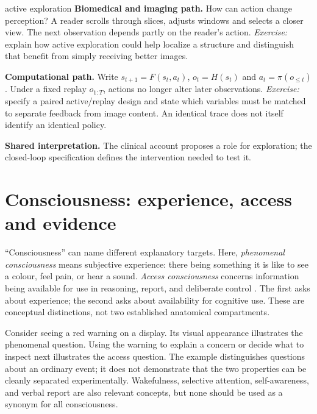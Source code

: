 \documentclass[11pt,a4paper]{article}
\begin{document}
\begin{perspectives}{active exploration}
\textbf{Biomedical and imaging path.} How can action change perception? A reader scrolls through slices, adjusts windows and selects a closer view. The next observation depends partly on the reader's action. \emph{Exercise:} explain how active exploration could help localize a structure and distinguish that benefit from simply receiving better images.

\textbf{Computational path.} Write $s_{t+1}=F(s_t,a_t)$, $o_t=H(s_t)$ and $a_t=\pi(o_{\leq t})$. Under a fixed replay $o_{1:T}$, actions no longer alter later observations. \emph{Exercise:} specify a paired active/replay design and state which variables must be matched to separate feedback from image content. An identical trace does not itself identify an identical policy.

\textbf{Shared interpretation.} The clinical account proposes a role for exploration; the closed-loop specification defines the intervention needed to test it.
\end{perspectives}


\section{Consciousness: experience, access and evidence}\label{sec:consciousness}
``Consciousness'' can name different explanatory targets. Here, \emph{phenomenal consciousness} means subjective experience: there being something it is like to see a colour, feel pain, or hear a sound. \emph{Access consciousness} concerns information being available for use in reasoning, report, and deliberate control \citep{block1995}. The first asks about experience; the second asks about availability for cognitive use. These are conceptual distinctions, not two established anatomical compartments.

Consider seeing a red warning on a display. Its visual appearance illustrates the phenomenal question. Using the warning to explain a concern or decide what to inspect next illustrates the access question. The example distinguishes questions about an ordinary event; it does not demonstrate that the two properties can be cleanly separated experimentally. Wakefulness, selective attention, self-awareness, and verbal report are also relevant concepts, but none should be used as a synonym for all consciousness.
\end{document}
